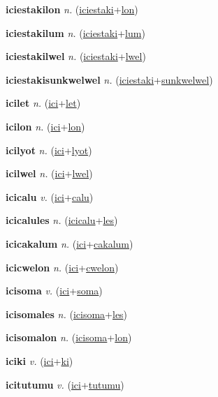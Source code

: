 \textbf{\hypertarget{iciestakilon}{iciestakilon}} \textit{n.} (\hyperlink{iciestaki}{iciestaki}+\allowbreak \hyperlink{lon}{lon})


\textbf{\hypertarget{iciestakilum}{iciestakilum}} \textit{n.} (\hyperlink{iciestaki}{iciestaki}+\allowbreak \hyperlink{lum}{lum})


\textbf{\hypertarget{iciestakilwel}{iciestakilwel}} \textit{n.} (\hyperlink{iciestaki}{iciestaki}+\allowbreak \hyperlink{lwel}{lwel})


\textbf{\hypertarget{iciestakisunkwelwel}{iciestakisunkwelwel}} \textit{n.} (\hyperlink{iciestaki}{iciestaki}+\allowbreak \hyperlink{sunkwelwel}{sunkwelwel})


\textbf{\hypertarget{icilet}{icilet}} \textit{n.} (\hyperlink{ici}{ici}+\allowbreak \hyperlink{let}{let})


\textbf{\hypertarget{icilon}{icilon}} \textit{n.} (\hyperlink{ici}{ici}+\allowbreak \hyperlink{lon}{lon})


\textbf{\hypertarget{icilyot}{icilyot}} \textit{n.} (\hyperlink{ici}{ici}+\allowbreak \hyperlink{lyot}{lyot})


\textbf{\hypertarget{icilwel}{icilwel}} \textit{n.} (\hyperlink{ici}{ici}+\allowbreak \hyperlink{lwel}{lwel})


\textbf{\hypertarget{icicalu}{icicalu}} \textit{v.} (\hyperlink{ici}{ici}+\allowbreak \hyperlink{calu}{calu})


\textbf{\hypertarget{icicalules}{icicalules}} \textit{n.} (\hyperlink{icicalu}{icicalu}+\allowbreak \hyperlink{les}{les})


\textbf{\hypertarget{icicakalum}{icicakalum}} \textit{n.} (\hyperlink{ici}{ici}+\allowbreak \hyperlink{cakalum}{cakalum})


\textbf{\hypertarget{icicwelon}{icicwelon}} \textit{n.} (\hyperlink{ici}{ici}+\allowbreak \hyperlink{cwelon}{cwelon})


\textbf{\hypertarget{icisoma}{icisoma}} \textit{v.} (\hyperlink{ici}{ici}+\allowbreak \hyperlink{soma}{soma})


\textbf{\hypertarget{icisomales}{icisomales}} \textit{n.} (\hyperlink{icisoma}{icisoma}+\allowbreak \hyperlink{les}{les})


\textbf{\hypertarget{icisomalon}{icisomalon}} \textit{n.} (\hyperlink{icisoma}{icisoma}+\allowbreak \hyperlink{lon}{lon})


\textbf{\hypertarget{iciki}{iciki}} \textit{v.} (\hyperlink{ici}{ici}+\allowbreak \hyperlink{ki}{ki})


\textbf{\hypertarget{icitutumu}{icitutumu}} \textit{v.} (\hyperlink{ici}{ici}+\allowbreak \hyperlink{tutumu}{tutumu})


